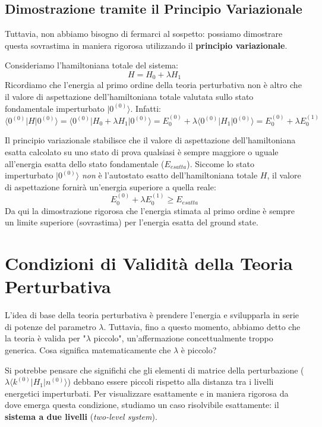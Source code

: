 \subsection{Dimostrazione tramite il Principio Variazionale}
Tuttavia, non abbiamo bisogno di fermarci al sospetto: possiamo dimostrare questa sovrastima in maniera rigorosa utilizzando il \textbf{principio variazionale}.

Consideriamo l'hamiltoniana totale del sistema:
\begin{equation}
H = H_0 + \lambda H_1
\end{equation}
Ricordiamo che l'energia al primo ordine della teoria perturbativa non è altro che il valore di aspettazione dell'hamiltoniana totale valutata sullo stato fondamentale imperturbato $\vert{}0^{(0)}\rangle$. Infatti:
\begin{equation}
\langle 0^{(0)} | H | 0^{(0)} \rangle = \langle 0^{(0)} | H_0 + \lambda H_1 | 0^{(0)} \rangle = E_0^{(0)} + \lambda \langle 0^{(0)} | H_1 | 0^{(0)} \rangle = E_0^{(0)} + \lambda E_0^{(1)}
\end{equation}

Il principio variazionale stabilisce che il valore di aspettazione dell'hamiltoniana esatta calcolato su uno stato di prova qualsiasi è sempre maggiore o uguale all'energia esatta dello stato fondamentale ($E_{esatta}$).
Siccome lo stato imperturbato $\vert{}0^{(0)}\rangle$ \textit{non} è l'autostato esatto dell'hamiltoniana totale $H$, il valore di aspettazione fornirà un'energia superiore a quella reale:
\begin{equation}
E_0^{(0)} + \lambda E_0^{(1)} \ge E_{esatta}
\end{equation}
Da qui la dimostrazione rigorosa che l'energia stimata al primo ordine è sempre un limite superiore (sovrastima) per l'energia esatta del ground state.

\section{Condizioni di Validità della Teoria Perturbativa}

L'idea di base della teoria perturbativa è prendere l'energia e svilupparla in serie di potenze del parametro $\lambda$. Tuttavia, fino a questo momento, abbiamo detto che la teoria è valida per "$\lambda$ piccolo", un'affermazione concettualmente troppo generica. Cosa significa matematicamente che $\lambda$ è piccolo?

Si potrebbe pensare che significhi che gli elementi di matrice della perturbazione ($\lambda \langle k^{(0)} \vert{} H_1 \vert{} n^{(0)} \rangle$) debbano essere piccoli rispetto alla distanza tra i livelli energetici imperturbati. Per visualizzare esattamente e in maniera rigorosa da dove emerga questa condizione, studiamo un caso risolvibile esattamente: il \textbf{sistema a due livelli} (\textit{two-level system}).

